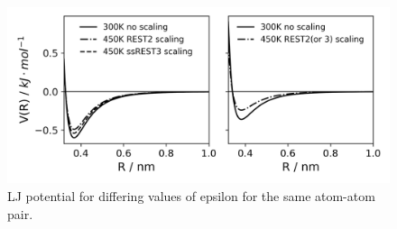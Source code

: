 \begin{figure}
    \includegraphics[width=\textwidth]{../Figure_a/fig_a.png}
    \caption{LJ potential for differing values of epsilon for the same atom-atom pair.}
    \label{fig:lj_curves}
\end{figure}